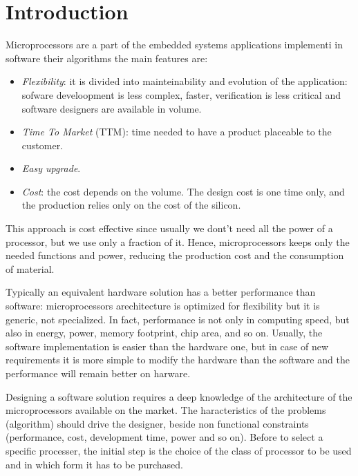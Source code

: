 \section{Introduction}

Microprocessors are a part of the embedded systems applications implementi in software their algorithms
the main features are: 
\begin{itemize}
    \item \textit{Flexibility}: it is divided into mainteinability and evolution of the application: sofware develoopment is less complex, faster, verification is less critical and software designers are available in volume.
    \item \textit{Time To Market} (TTM): time needed to have a product placeable to the customer.
    \item \textit{Easy upgrade}.
    \item \textit{Cost}: the cost depends on the volume. 
        The design cost is one time only, and the production relies only on the cost of the silicon.
\end{itemize}
This approach is cost effective since usually we dont't need all the power of a processor, but we use only a fraction of it. 
Hence, microprocessors keeps only the needed functions and power, reducing the production cost and the consumption of material. 

Typically an equivalent hardware solution has a better performance than software: microprocessors arechitecture is optimized for flexibility but it is generic, not specialized.
In fact, performance is not only in computing speed, but also in energy, power, memory footprint, chip area, and so on.
Usually, the software implementation is easier than the hardware one, but in case of new requirements it is more simple to modify the hardware than the software and the performance will remain better on harware. 

Designing a software solution requires a deep knowledge of the architecture of the microprocessors available on the market. 
The haracteristics of the problems (algorithm) should drive the designer, beside non functional constraints (performance, cost, development time, power and so on).
Before to select a specific processer, the initial step is the choice of the class of processor to be used and in which form it has to be purchased.



